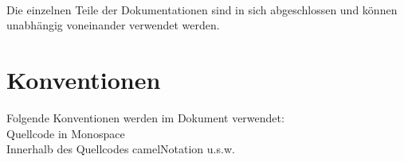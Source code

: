 \paragraph{}
Die einzelnen Teile der Dokumentationen sind in sich abgeschlossen und können unabhängig voneinander verwendet werden.

\section*{Konventionen}
Folgende Konventionen werden im Dokument verwendet:\\
Quellcode in Monospace\\
Innerhalb des Quellcodes camelNotation u.s.w.